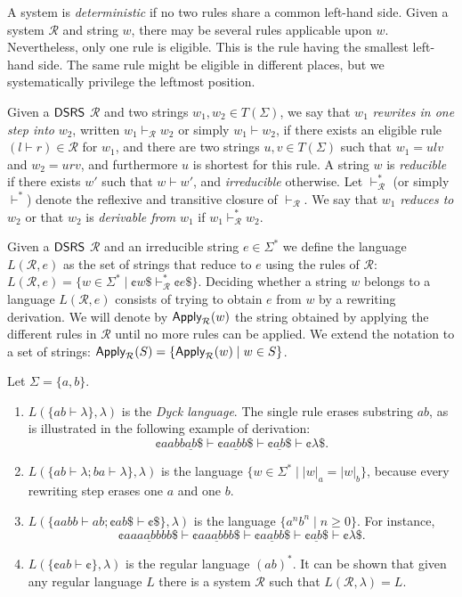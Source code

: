 A system is \emph{deterministic} if no two rules share a common left-hand side. Given a system $\mathcal{R}$ and string $w$, there may be several rules applicable upon $w$. Nevertheless, only one rule is eligible. This is the rule having the smallest left-hand side. The same rule might be eligible in different places, but we systematically privilege the leftmost position.

Given a $\textup{\sf DSRS}$ $\mathcal{R}$ and two strings $w_1, w_2 \in T(\Sigma)$, we say that $w_1$ \emph{rewrites in one step into} $w_2$, written $w_1 \vdash_{\mathcal{R}} w_2$ or simply $w_1 \vdash w_2$, if there exists an eligible rule $(l \vdash r) \in \mathcal{R}$ for $w_1$, and there are two strings $u, v \in T(\Sigma)$ such that $w_1 = ulv$ and $w_2 = urv$, and furthermore $u$ is shortest for this rule. A string $w$ is \emph{reducible} if there exists $w'$ such that $w \vdash w'$, and \emph{irreducible} otherwise. Let $\vdash_{\mathcal{R}}^* $ (or simply $\vdash^*$) denote the reflexive and transitive closure of $\vdash_{\mathcal{R}}$. We say that $w_1$ \emph{reduces to} $w_2$ or that $w_2$ is \emph{derivable from} $w_1$ if $w_1 \vdash_{\mathcal{R}}^* w_2$.

Given a $\textup{\sf DSRS}$ $\mathcal{R}$ and an irreducible string $e \in \Sigma^*$ we define the language $L(\mathcal{R}, e)$ as the set of strings that reduce to $e$ using the rules of $\mathcal{R}$: $L(\mathcal{R}, e) = \{ w \in \Sigma^* \mid \cent w \$ \vdash_{\mathcal{R}}^* \cent e \$ \}.$ Deciding whether a string $w$ belongs to a language $L(\mathcal{R}, e)$ consists of trying to obtain $e$ from $w$ by a rewriting derivation. We will denote by $\textup{\sf Apply}_{\mathcal{R}}(w)$ the string obtained by applying the different rules in $\mathcal{R}$ until no more rules can be applied. We extend the notation to a set of strings: $\textup{\sf Apply}_{\mathcal{R}}(S) = \{\textup{\sf Apply}_{\mathcal{R}}(w) \mid w \in S\}$.

\begin{example}
Let $\Sigma = \{a, b\}$. 
\begin{enumerate}
\item $L(\{ab \vdash \lambda\}, \lambda)$ is the \emph{Dyck language}. The single rule erases substring $ab$, as is illustrated in the following example of derivation:
$$\cent aabb \underline{ab} \$ \vdash
\cent a \underline{ab} b \$ \vdash
\cent \underline{ab} \$ \vdash
\cent \lambda \$.$$
\item $L(\{ab \vdash \lambda; ba \vdash \lambda\}, \lambda)$ is the language $\{w \in \Sigma^* \mid |w|_a = |w|_b\}$, because every rewriting step erases one $a$ and one $b$.
\item $L(\{aabb \vdash ab; \cent ab \$ \vdash \cent \$\}, \lambda)$ is the language $\{a^n b^n \mid n \ge 0\}$. For instance, 
$$\cent aa \underline{aabb} bb \$ \vdash
\cent a \underline{aabb} b \$ \vdash
\cent \underline{aabb} \$ \vdash
\cent \underline{ab} \$ \vdash
\cent \lambda \$.$$
\item $L(\{\cent ab \vdash \cent \}, \lambda)$ is the regular language $(ab)^*$. It can be shown that given any regular language $L$ there is a system $\mathcal{R}$ such that $L(\mathcal{R}, \lambda) = L$.
\end{enumerate}
\end{example}

